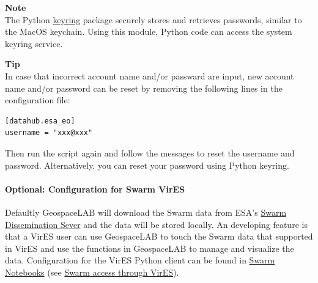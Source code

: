 \begin{framed}
\textbf{Note}\\
The Python \href{https://github.com/jaraco/keyring}{keyring} package securely stores and retrieves passwords, similar to the MacOS keychain. Using this module, Python code can access the system keyring service.
\end{framed}

\begin{framed}
\textbf{Tip}\\
In case that incorrect account name and/or passward are input, new account name and/or password can be reset by removing the following lines in the configuration file:

\begin{verbatim}
[datahub.esa_eo]
username = "xxx@xxx"
\end{verbatim}

Then run the script again and follow the messages to reset the username and password. Alternatively, you can reset your password using Python keyring.
\end{framed}

\paragraph{Optional: Configuration for Swarm VirES}

Defaultly GeospaceLAB will download the Swarm data from ESA's \href{https://swarm-diss.eo.esa.int/}{Swarm Dissemination Sever} and the data will be stored locally. An developing feature is that a VirES user can use GeospaceLAB to touch the Swarm data that supported in VirES and use the functions in GeospaceLAB to manage and visualize the data. Configuration for the VirES Python client can be found in \href{https://notebooks.vires.services/docs/welcome}{Swarm Notebooks} (see \href{https://notebooks.vires.services/notebooks/02a\_\_intro-swarm-viresclient}{Swarm access through VirES}).